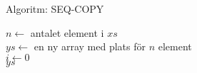 \begin{Slide}{Algoritm: SEQ-COPY}
\begin{algorithm}[H]
 $n \leftarrow$ antalet element i $xs$ \\
 $ys \leftarrow$ en ny array med plats för $n$ element\\
 $i \leftarrow 0$  \\
 \Return $ys$
\end{algorithm}
\end{Slide}



